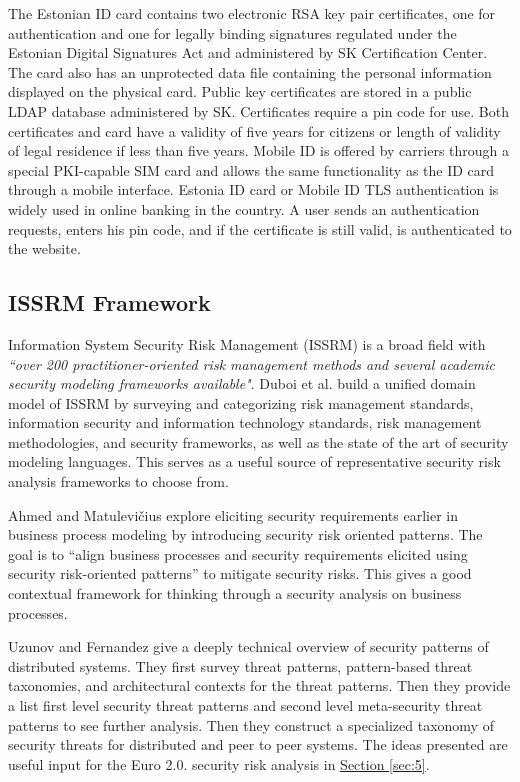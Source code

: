 \documentclass[a4paper,12pt]{article} %
\newcommand{\hypersectionref}[1]{\hyperref[#1]{Section \ref{#1}}}
\begin{document}
The Estonian ID card contains two electronic RSA key pair certificates, one for authentication and one for legally binding signatures regulated under the Estonian Digital Signatures Act and administered by SK Certification Center\cite{aboutSk2017}. The card also has an unprotected data file containing the personal information displayed on the physical card. Public key certificates are stored in a public LDAP database administered by SK\cite{skAboutLdap2017}. Certificates require a pin code for use. Both certificates and card have a validity of five years for citizens or length of validity of legal residence if less than five years. Mobile ID is offered by carriers through a special PKI-capable SIM card and allows the same functionality as the ID card through a mobile interface. Estonia ID card or Mobile ID TLS authentication is widely used in online banking in the country. A user sends an authentication requests, enters his pin code, and if the certificate is still valid, is authenticated to the website.


\subsection{ISSRM Framework} \label{ssec:2:issrmFramework}

Information System Security Risk Management (ISSRM) is a broad field with \textit{``over 200 practitioner-oriented risk management methods and several academic security modeling frameworks available"}\cite{Dubois2010}. Duboi et al. build a unified domain model of ISSRM by surveying and categorizing risk management standards, information security and information technology standards, risk management methodologies, and security frameworks, as well as the state of the art of security modeling languages. This serves as a useful source of representative security risk analysis frameworks to choose from.

Ahmed and Matulevi\v{c}ius explore eliciting security requirements earlier in business process modeling by introducing security risk oriented patterns\cite{Ahmed:2014:SBP:2588915.2589308}. The goal is to ``align business processes and security requirements elicited using security risk-oriented patterns'' to mitigate security risks. This gives a good contextual framework for thinking through a security analysis on business processes.

Uzunov and Fernandez give a deeply technical overview of security patterns of distributed systems\cite{Uzunov:2014:EPL:2588915.2589309}. They first survey threat patterns, pattern-based threat taxonomies, and architectural contexts for the threat patterns. Then they provide a list first level security threat patterns and second level meta-security threat patterns to see further analysis. Then they construct a specialized taxonomy of security threats for distributed and peer to peer systems. The ideas presented are useful input for the Euro 2.0. security risk analysis in \hypersectionref{sec:5}.
\end{document}
